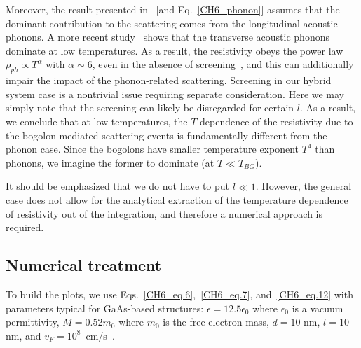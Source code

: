 Moreover, the result presented in~\cite{Hwang:2008aa} [and Eq.~\eqref{CH6_phonon}] assumes that the dominant contribution to the scattering comes from the longitudinal acoustic phonons.
A more recent study~\cite{Kaasbjerg:2012aa} shows that the transverse acoustic phonons dominate at low temperatures.
As a result, the resistivity obeys the power law $\rho_{ph}\propto T^\alpha$ with $\alpha\sim 6$, even in the absence of screening~\cite{Hwang:2007aa}, and this can additionally impair the impact of the phonon-related scattering.
Screening in our hybrid system case is a nontrivial issue requiring separate consideration.
Here we may simply note that the screening can likely be disregarded for certain $l$.
As a result, we conclude that at low temperatures, the $T$-dependence of the resistivity due to the bogolon-mediated scattering events is fundamentally different from the phonon case.
Since the bogolons have smaller temperature exponent $T^4$ than phonons, we imagine the former to dominate (at $T\ll T_{BG}$).

It should be emphasized that we do not have to put $\tilde{l}\ll 1$. However, the general case does not allow for the analytical extraction of the temperature dependence of resistivity out of the integration, and therefore a numerical approach is required.

%
%
\subsection{Numerical treatment}
To build the plots, we use Eqs.~\eqref{CH6_eq.6},~\eqref{CH6_eq.7}, and~\eqref{CH6_eq.12} with parameters typical for GaAs-based structures: $\epsilon=12.5\epsilon_0$ where $\epsilon_0$ is a vacuum permittivity, $M=0.52m_0$ where $m_0$ is the free electron mass, $d=10$ nm, $l=10$ nm, and $v_F=10^8$~cm/s~\cite{Castro-Neto:2009aa,Das-Sarma:2011aa}.

